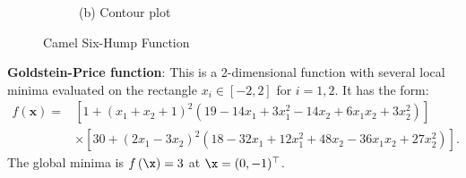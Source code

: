 \documentclass [PhD] {package/uclathes}
\begin{document}
\begin{figure}
\begin{subfigure}[b]{0.4\textwidth}
  \caption*{(b) Contour plot}
\end{subfigure}
\caption{Camel Six-Hump Function}
    \label{fig:camel6}
\end{figure}

\textbf{Goldstein-Price function}: This is a 2-dimensional function with several local minima evaluated on the rectangle $x_i\in [-2,2]$ for $i=1,2$. It has the form:
\begin{equation}
\begin{aligned}
f(\mathbf{x})= & {\left[1+\left(x_1+x_2+1\right)^2\left(19-14 x_1+3 x_1^2-14 x_2+6 x_1 x_2+3 x_2^2\right)\right] } \\
& \times\left[30+\left(2 x_1-3 x_2\right)^2\left(18-32 x_1+12 x_1^2+48 x_2-36 x_1 x_2+27 x_2^2\right)\right].
\end{aligned}
\end{equation}
The global minima is $f\left(\x\right) = 3$ at \(\x=(0,-1)^\top\).
\end{document}
